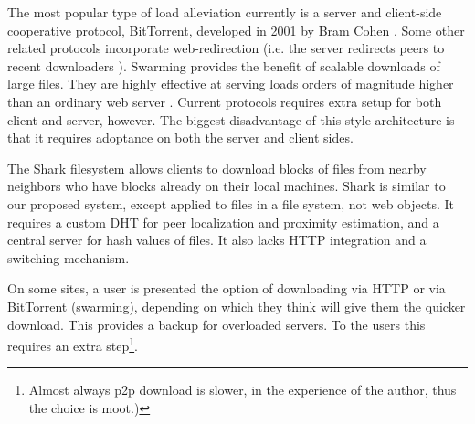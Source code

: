 The most popular type of load alleviation currently is a server and client-side cooperative protocol, BitTorrent,  developed in 2001 by Bram Cohen \cite{cohen}.
Some other related protocols incorporate web-redirection (i.e. the server redirects peers to recent downloaders \cite{overhaul, webtorrent, onion, zappala, cohen,
slurpie, mutualcast, fastreplica, avalanche, bullet_prime, onion}).  
Swarming provides the benefit of scalable downloads of large files.  
They are highly effective at serving loads orders of magnitude higher than an ordinary web server \cite{zappala}. 
Current protocols requires extra setup for both client and server, however.
The biggest disadvantage of this style architecture is that it requires adoptance on both the server and client sides.

The Shark \cite{shark} filesystem allows clients to download blocks of files from nearby neighbors who have blocks already on their local machines.  
Shark is similar to our proposed system, except applied to files in a file system, not web objects.  
It requires a custom DHT for peer localization and proximity estimation, and a central server for hash values of files.  
It also lacks HTTP integration and a switching mechanism.

On some sites, a user is presented the option of downloading via HTTP or via BitTorrent (swarming), depending on which they think will give them the 
quicker download.  This provides a backup for overloaded servers.  To the users this requires an extra step\footnote{Almost always p2p download is slower, in the experience of the author, thus the choice is moot.)}. 

